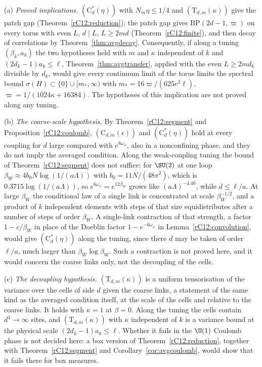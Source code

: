 \begin{remark}\label{rC12:meaning}
(a) \emph{Proved implications.} $(\mathrm C^*_d(\eta))$ with $N_m\eta\le1/4$
and $(\mathrm T_{d,m}(\kappa))$ give the patch gap
(Theorem~\ref{rC12:reduction}); the patch gap gives
$\mathrm{BP}(2d-1,\varpi)$ on every torus with even $L$, $d\mid L$,
$L\ge2md$ (Theorem~\ref{rC12:finite}), and then decay of correlations by
Theorem~\ref{thm:avgdecay}. Consequently, if along a tuning $(\beta_k,a_k)$
the two hypotheses held with $m$ and $\kappa$ independent of $k$ and
$(2d_k-1)a_k\le\ell$, Theorem~\ref{thm:avgtransfer}, applied with the even
$L\ge2md_k$ divisible by $d_k$, would give every continuum limit of the
torus limits the spectral bound $\sigma(H)\subset\{0\}\cup[m_*,\infty)$
with $m_*=16\varpi/(625e^2\ell)$, $\varpi=1/(1024\kappa+16384)$. The
hypotheses of this implication are not proved along any tuning.

(b) \emph{The coarse-scale hypothesis.} By Theorem~\ref{rC12:segment} and
Proposition~\ref{rC12:coulomb}, $(\mathrm C_{d,m}(\epsilon))$ and
$(\mathrm C^*_d(\eta))$ hold at every coupling for $d$ large compared with
$e^{6\omega_\varphi}$, also in a nonconfining phase, and they do not imply
the averaged condition. Along the weak-coupling tuning the bound of
Theorem~\ref{rC12:segment} does not suffice: for $\SU(2)$ at one loop
$\beta_W\approx4b_0N\log(1/(a\Lambda))$ with $b_0=11N/(48\pi^2)$, which is
$0.3715\log(1/(a\Lambda))$, so $e^{6\omega_\varphi}=e^{12\beta_W}$ grows like
$(a\Lambda)^{-4.46}$, while $d\le\ell/a$. At large $\beta_W$ the
conditional law of a single link is concentrated at scale
$\beta_W^{-1/2}$, and a product of $k$ independent elements with steps of
that size equidistributes after a number of steps of order $\beta_W$. A
single-link contraction of that strength, a factor $1-c/\beta_W$ in place of
the Doeblin factor $1-e^{-6\omega_\varphi}$ in
Lemma~\ref{rC12:convolution}, would give $(\mathrm C^*_d(\eta))$ along
the tuning, since there $d$ may be taken of order $\ell/a$, much larger
than $\beta_W\log\beta_W$. Such a contraction is not proved here, and it would
concern the coarse links only, not the decoupling of the cells.

(c) \emph{The decoupling hypothesis.} $(\mathrm T_{d,m}(\kappa))$ is a
uniform tensorisation of the variance over the cells of side $d$ given the
coarse links, a statement of the same kind as the averaged condition
itself, at the scale of the cells and relative to the coarse links. It holds
with $\kappa=1$ at $\beta=0$. Along the tuning the cells contain $d^4\to
\infty$ sites, and $(\mathrm T_{d,m}(\kappa))$ with $\kappa$ independent of
$k$ is a variance bound at the physical scale $(2d_k-1)a_k\le\ell$. Whether
it fails in the $\U(1)$ Coulomb phase is not decided here: a box version of
Theorem~\ref{rC12:reduction}, together with Theorem~\ref{rC12:segment} and
Corollary~\ref{cor:avgcoulomb}, would show that it fails there for box
measures.


\end{remark}
